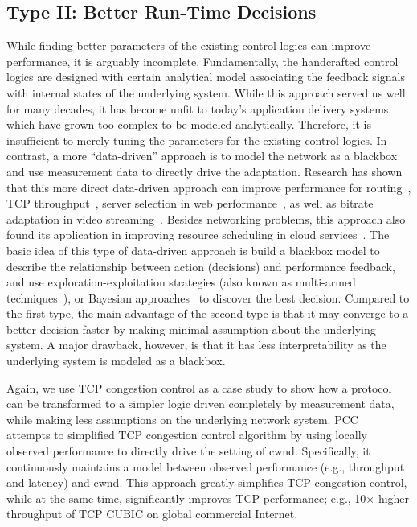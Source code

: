 
\subsection{Type II: Better Run-Time Decisions}

While finding better parameters of the existing control logics
can improve performance, it is arguably incomplete.
Fundamentally, the handcrafted control logics are 
designed with certain analytical model
associating the feedback signals with internal states of the 
underlying system. While this approach served us well for 
many decades, it has become unfit to today's
application delivery systems, which have grown too complex
to be modeled analytically. Therefore, it is insufficient to 
merely tuning the parameters for the existing control logics.
In contrast, a more ``data-driven'' approach 
is to model the network as a blackbox and use measurement data 
to directly drive the adaptation.
Research has shown that this more direct data-driven 
approach can improve performance for routing~\cite{schapira2010putting},
TCP throughput~\cite{pcc}, server selection in web 
performance~\cite{footprint}, as well as bitrate adaptation in 
video streaming~\cite{neural-streaming}.
Besides networking problems, this approach also found its
application in improving resource scheduling in 
cloud services~\cite{cherrypick}.
The basic idea of this type of data-driven approach is
build a blackbox model to describe the relationship between 
action (decisions) and performance feedback, 
and use exploration-exploitation strategies (also
known as multi-armed techniques~\cite{mab}), or 
Bayesian approaches~\cite{bayesian-optimization} to discover 
the best decision.
Compared to the first type, the main advantage of the 
second type is that it may converge to a better decision
faster by making minimal assumption about the 
underlying  system. 
A major drawback, however, is that it has less interpretability
as the underlying system is modeled as a blackbox.


\noindent\underline{}
Again, we use TCP congestion control as a case study to show
how a protocol can be transformed to a simpler logic driven
completely by measurement data, while making less
assumptions on the underlying network system.
PCC~\cite{pcc} attempts to simplified TCP congestion 
control algorithm by using locally observed performance 
to directly drive the setting of cwnd. 
Specifically, it continuously maintains a model between 
observed performance (e.g., throughput and latency) 
and cwnd. This approach greatly simplifies TCP congestion
control, while at the same time, significantly 
improves TCP performance; e.g., 10$\times$ higher
throughput of TCP CUBIC on global commercial Internet.

